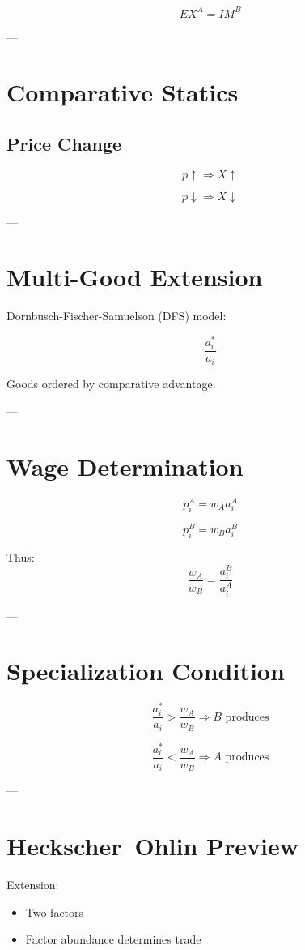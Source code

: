 \[
EX^A = IM^B
\]

---

\section{Comparative Statics}

\subsection{Price Change}

\[
p \uparrow \Rightarrow X \uparrow
\]

\[
p \downarrow \Rightarrow X \downarrow
\]

---

\section{Multi-Good Extension}

Dornbusch-Fischer-Samuelson (DFS) model:

\[
\frac{a_i^*}{a_i}
\]

Goods ordered by comparative advantage.

---

\section{Wage Determination}

\[
p_i^A = w_A a_i^A
\]

\[
p_i^B = w_B a_i^B
\]

Thus:
\[
\frac{w_A}{w_B} = \frac{a_i^B}{a_i^A}
\]

---

\section{Specialization Condition}

\[
\frac{a_i^*}{a_i} > \frac{w_A}{w_B} \Rightarrow B \text{ produces}
\]

\[
\frac{a_i^*}{a_i} < \frac{w_A}{w_B} \Rightarrow A \text{ produces}
\]

---

\section{Heckscher--Ohlin Preview}

Extension:

\begin{itemize}
    \item Two factors
    \item Factor abundance determines trade
\end{itemize}